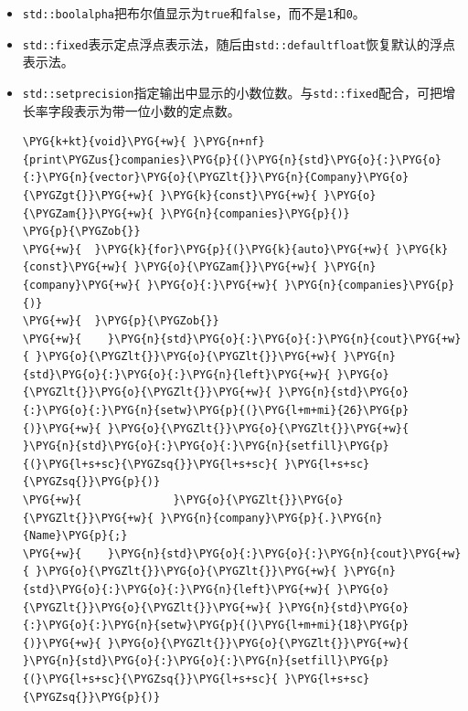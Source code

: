 \begin{itemize}
\item \texttt{std::\allowbreak{}boolalpha}把布尔值显示为\texttt{true}和\texttt{false}，而不是\texttt{1}和\texttt{0}。



\item \texttt{std::\allowbreak{}fixed}表示定点浮点表示法，随后由\texttt{std::\allowbreak{}defaultfloat}恢复默认的浮点表示法。



\item \texttt{std::\allowbreak{}setprecision}指定输出中显示的小数位数。与\texttt{std::\allowbreak{}fixed}配合，可把增长率字段表示为带一位小数的定点数。



\begin{codeblockbg}
\begin{Verbatim}[commandchars=\\\{\},breaklines=true,breakanywhere=true,fontsize=\codefont,xleftmargin=17bp]
\PYG{k+kt}{void}\PYG{+w}{ }\PYG{n+nf}{print\PYGZus{}companies}\PYG{p}{(}\PYG{n}{std}\PYG{o}{:}\PYG{o}{:}\PYG{n}{vector}\PYG{o}{\PYGZlt{}}\PYG{n}{Company}\PYG{o}{\PYGZgt{}}\PYG{+w}{ }\PYG{k}{const}\PYG{+w}{ }\PYG{o}{\PYGZam{}}\PYG{+w}{ }\PYG{n}{companies}\PYG{p}{)}
\PYG{p}{\PYGZob{}}
\PYG{+w}{  }\PYG{k}{for}\PYG{p}{(}\PYG{k}{auto}\PYG{+w}{ }\PYG{k}{const}\PYG{+w}{ }\PYG{o}{\PYGZam{}}\PYG{+w}{ }\PYG{n}{company}\PYG{+w}{ }\PYG{o}{:}\PYG{+w}{ }\PYG{n}{companies}\PYG{p}{)}
\PYG{+w}{  }\PYG{p}{\PYGZob{}}
\PYG{+w}{    }\PYG{n}{std}\PYG{o}{:}\PYG{o}{:}\PYG{n}{cout}\PYG{+w}{ }\PYG{o}{\PYGZlt{}}\PYG{o}{\PYGZlt{}}\PYG{+w}{ }\PYG{n}{std}\PYG{o}{:}\PYG{o}{:}\PYG{n}{left}\PYG{+w}{ }\PYG{o}{\PYGZlt{}}\PYG{o}{\PYGZlt{}}\PYG{+w}{ }\PYG{n}{std}\PYG{o}{:}\PYG{o}{:}\PYG{n}{setw}\PYG{p}{(}\PYG{l+m+mi}{26}\PYG{p}{)}\PYG{+w}{ }\PYG{o}{\PYGZlt{}}\PYG{o}{\PYGZlt{}}\PYG{+w}{ }\PYG{n}{std}\PYG{o}{:}\PYG{o}{:}\PYG{n}{setfill}\PYG{p}{(}\PYG{l+s+sc}{\PYGZsq{}}\PYG{l+s+sc}{ }\PYG{l+s+sc}{\PYGZsq{}}\PYG{p}{)}
\PYG{+w}{              }\PYG{o}{\PYGZlt{}}\PYG{o}{\PYGZlt{}}\PYG{+w}{ }\PYG{n}{company}\PYG{p}{.}\PYG{n}{Name}\PYG{p}{;}
\PYG{+w}{    }\PYG{n}{std}\PYG{o}{:}\PYG{o}{:}\PYG{n}{cout}\PYG{+w}{ }\PYG{o}{\PYGZlt{}}\PYG{o}{\PYGZlt{}}\PYG{+w}{ }\PYG{n}{std}\PYG{o}{:}\PYG{o}{:}\PYG{n}{left}\PYG{+w}{ }\PYG{o}{\PYGZlt{}}\PYG{o}{\PYGZlt{}}\PYG{+w}{ }\PYG{n}{std}\PYG{o}{:}\PYG{o}{:}\PYG{n}{setw}\PYG{p}{(}\PYG{l+m+mi}{18}\PYG{p}{)}\PYG{+w}{ }\PYG{o}{\PYGZlt{}}\PYG{o}{\PYGZlt{}}\PYG{+w}{ }\PYG{n}{std}\PYG{o}{:}\PYG{o}{:}\PYG{n}{setfill}\PYG{p}{(}\PYG{l+s+sc}{\PYGZsq{}}\PYG{l+s+sc}{ }\PYG{l+s+sc}{\PYGZsq{}}\PYG{p}{)}

\end{Verbatim}
\end{codeblockbg}
\end{itemize}
